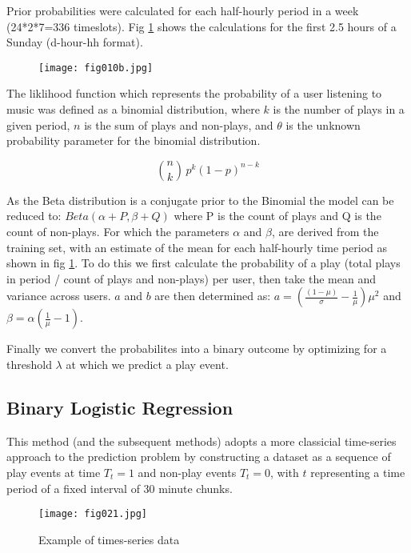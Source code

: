 Prior probabilities were calculated for each half-hourly period in a week (24*2*7=336 timeslots). Fig \ref{fig10b} shows the calculations for the first 2.5 hours of a Sunday (d-hour-hh format). 

\begin{figure}[h!]
	\centering
	\texttt{[image: fig010b.jpg]}
	\caption{}
	\label{fig10b}
\end{figure} 

The liklihood function which represents the probability of a user listening to music was defined as a binomial distribution, where $k$ is the number of plays in a given period, $n$ is the sum of plays and non-plays, and $\theta$ is the unknown probability parameter for the binomial distribution.

$${n \choose k}\,p^{k}(1-p)^{n-k}$$

As the Beta distribution is a conjugate prior to the Binomial the model can be reduced to: $Beta(\alpha+P, \beta+Q)$ where P is the count of plays and Q is the count of non-plays. For which the parameters $\alpha$ and $\beta$, are derived from the training set, with an estimate of the mean for each half-hourly time period as shown in fig \ref{fig10b}. To do this we first calculate the probability of a play (total plays in period / count of plays and non-plays) per user, then take the mean and variance across users. $a$ and $b$ are then determined as:
$a = (\frac{(1- \mu)}{\sigma} - \frac{1}{\mu}) \mu^2$
and
$\beta=\alpha\left(\frac{1}{\mu}-1\right)$.

Finally we convert the probabilites into a binary outcome by optimizing for a threshold $\lambda$ at which we predict a play event.

\subsection{Binary Logistic Regression}

This method (and the subsequent methods) adopts a more classicial time-series approach to the prediction problem by constructing a dataset as a sequence of play events at time $T_t = 1$ and non-play events $T_t = 0$, with $t$ representing a time period of a fixed interval of 30 minute chunks.

\begin{figure}[h!]
	\centering
	\texttt{[image: fig021.jpg]}
	\caption{Example of times-series data}
	\label{fig021}
\end{figure} 

